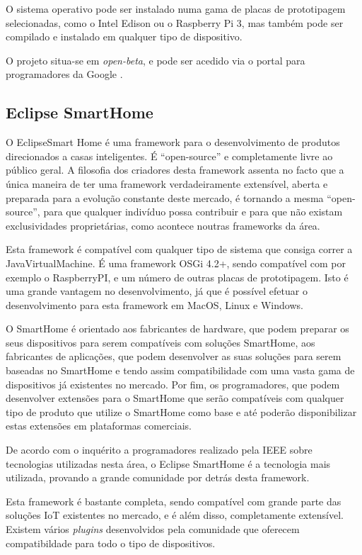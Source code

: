 O sistema operativo pode ser instalado numa gama de placas de prototipagem selecionadas, como o Intel Edison ou o Raspberry Pi 3, mas também pode ser compilado e instalado em qualquer tipo de dispositivo.

O projeto situa-se em \textit{open-beta}, e pode ser acedido via o portal para programadores da Google \cite{android-things}.

\subsection{Eclipse SmartHome}

O EclipseSmart Home é uma framework para o desenvolvimento de produtos direcionados a casas inteligentes. É “open-source” e completamente livre ao público geral. A filosofia dos criadores desta framework assenta no facto que a única maneira de ter uma framework verdadeiramente extensível, aberta e preparada para a evolução constante deste mercado, é tornando a mesma “open-source”, para que qualquer indivíduo possa contribuir e para que não existam exclusividades proprietárias, como acontece noutras frameworks da área. 

Esta framework é compatível com qualquer tipo de sistema que consiga correr a JavaVirtualMachine. É uma framework OSGi 4.2+, sendo compatível com por exemplo o RaspberryPI, e um número de outras placas de prototipagem. Isto é uma grande vantagem no desenvolvimento, já que é possível efetuar o desenvolvimento para esta framework em MacOS, Linux e Windows.


O SmartHome é orientado aos fabricantes de hardware, que podem preparar os seus dispositivos para serem compatíveis com soluções SmartHome, aos fabricantes de aplicações, que podem desenvolver as suas soluções para serem baseadas no SmartHome e tendo assim compatibilidade com uma vasta gama de dispositivos já existentes no mercado. Por fim, os programadores, que podem desenvolver extensões para o SmartHome que serão compatíveis com qualquer tipo de produto que utilize o SmartHome como base e até poderão disponibilizar estas extensões em plataformas comerciais.

De acordo com o inquérito \cite{ieeesurvey} a programadores realizado pela IEEE sobre tecnologias utilizadas nesta área, o Eclipse SmartHome é a tecnologia mais utilizada, provando a grande comunidade por detrás desta framework.

Esta framework é bastante completa, sendo compatível com grande parte das soluções IoT existentes no mercado, e é além disso, completamente extensível. Existem vários \textit{plugins} desenvolvidos pela comunidade que oferecem compatibildade para todo o tipo de dispositivos.

